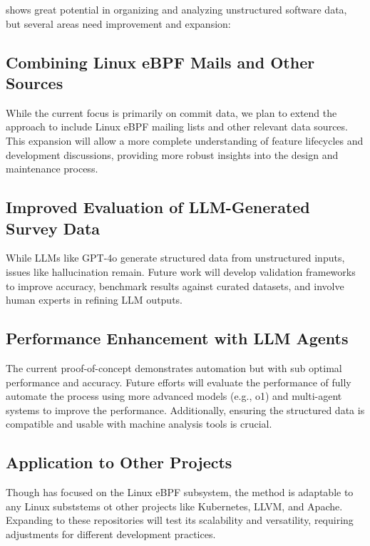 \emph{\sys} shows great potential in organizing and analyzing unstructured software data, but several areas need improvement and expansion:

\subsection{Combining Linux eBPF Mails and Other Sources}

While the current focus is primarily on commit data, we plan to extend the approach to include Linux eBPF mailing lists and other relevant data sources. This expansion will allow a more complete understanding of feature lifecycles and development discussions, providing more robust insights into the design and maintenance process.

\subsection{Improved Evaluation of LLM-Generated Survey Data}

While LLMs like GPT-4o generate structured data from unstructured inputs, issues like hallucination remain. Future work will develop validation frameworks to improve accuracy, benchmark results against curated datasets, and involve human experts in refining LLM outputs.

\subsection{Performance Enhancement with LLM Agents}

The current proof-of-concept demonstrates automation but with sub optimal performance and accuracy. Future efforts will evaluate the performance of fully automate the process using more advanced models (e.g., o1) and multi-agent systems to improve the performance. Additionally, ensuring the structured data is compatible and usable with machine analysis tools is crucial.

\subsection{Application to Other Projects}

Though \emph{\sys} has focused on the Linux eBPF subsystem, the method is adaptable to any Linux subststems ot other projects like Kubernetes, LLVM, and Apache. Expanding to these repositories will test its scalability and versatility, requiring adjustments for different development practices.

